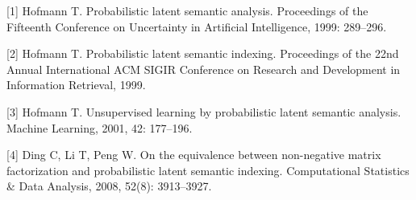 \documentclass[UTF8,12pt,a4paper,fontset=fandol]{ctexart}
\begin{document}
[1] Hofmann T. Probabilistic latent semantic analysis. Proceedings of the Fifteenth Conference on Uncertainty in Artificial Intelligence, 1999: 289--296.

[2] Hofmann T. Probabilistic latent semantic indexing. Proceedings of the 22nd Annual International ACM SIGIR Conference on Research and Development in Information Retrieval, 1999.

[3] Hofmann T. Unsupervised learning by probabilistic latent semantic analysis. Machine Learning, 2001, 42: 177--196.

[4] Ding C, Li T, Peng W. On the equivalence between non-negative matrix factorization and probabilistic latent semantic indexing. Computational Statistics \& Data Analysis, 2008, 52(8): 3913--3927.
\end{document}
